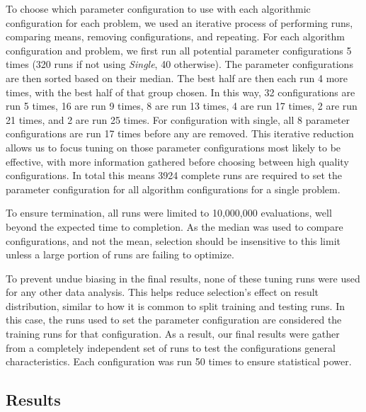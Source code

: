 \documentclass[journal]{IEEEtran}
\begin{document}
To choose which parameter configuration to use with each algorithmic configuration
for each problem, we used an iterative process of performing runs, comparing means, removing configurations,
and repeating.  For each algorithm configuration and problem, we first run all
potential parameter configurations 5 times (320 runs if not using \emph{Single}, 40 otherwise).
The parameter configurations are then sorted based on their median.  The best half are then
each run 4 more times, with the best half of that group chosen.  In this way, 32 configurations
are run 5 times, 16 are run 9 times, 8 are run 13 times, 4 are run 17 times, 2 are run 21 times,
and 2 are run 25 times.  For configuration with single, all 8 parameter configurations are run 17 times
before any are removed.  This iterative reduction allows us to focus tuning on
those parameter configurations most likely to be effective, with more information
gathered before choosing between high quality configurations.  In total this means
3924 complete runs are required to set the parameter configuration for all
algorithm configurations for a single problem.

To ensure termination, all runs were limited to 10,000,000 evaluations, well beyond
the expected time to completion.  As the median was used to compare configurations,
and not the mean, selection should be insensitive to this limit unless a large
portion of runs are failing to optimize.

To prevent undue biasing in the final results, none of these tuning runs were
used for any other data analysis.  This helps reduce selection's effect on
result distribution, similar to how it is common to split training and testing
runs.  In this case, the runs used to set the parameter configuration are considered
the training runs for that configuration.  As a result, our final results were gather
from a completely independent set of runs to test the configurations general characteristics.
Each configuration was run 50 times to ensure statistical power.

\subsection{Results}
\end{document}
